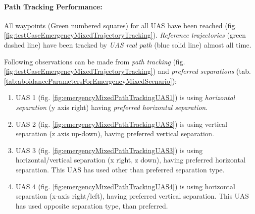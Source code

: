     \noindent\paragraph{Path Tracking Performance:} All waypoints (Green numbered squares) for all UAS have been reached (fig. \ref{fig:testCaseEmergencyMixedTrajectoryTracking}). \emph{Reference trajectories} (green dashed line) have been tracked by \emph{UAS real path} (blue solid line) almost all time. 
    
    Following observations can be made from \emph{path tracking} (fig. \ref{fig:testCaseEmergencyMixedTrajectoryTracking}) and \emph{preferred separations} (tab. \ref{tab:aboidanceParametersForEmergencyMixedScenario}):
    
    \begin{enumerate}
        \item UAS 1 (fig. \ref{fig:emergencyMixedPathTrackingUAS1}) is using \emph{horizontal separation} (y axis right) having \emph{preferred horizontal separation}.
        
        \item UAS 2 (fig. \ref{fig:emergencyMixedPathTrackingUAS2}) is using vertical separation (z axis up-down), having preferred vertical separation.
        
        \item UAS 3 (fig. \ref{fig:emergencyMixedPathTrackingUAS3}) is using horizontal/vertical separation (x right, z down), having preferred horizontal separation.  This UAS has used other than preferred separation type.
        
        \item UAS 4 (fig. \ref{fig:emergencyMixedPathTrackingUAS4}) is using horizontal separation (x-axis right/left), having preferred vertical separation. This UAS has used opposite separation type, than preferred.
    \end{enumerate}
    
